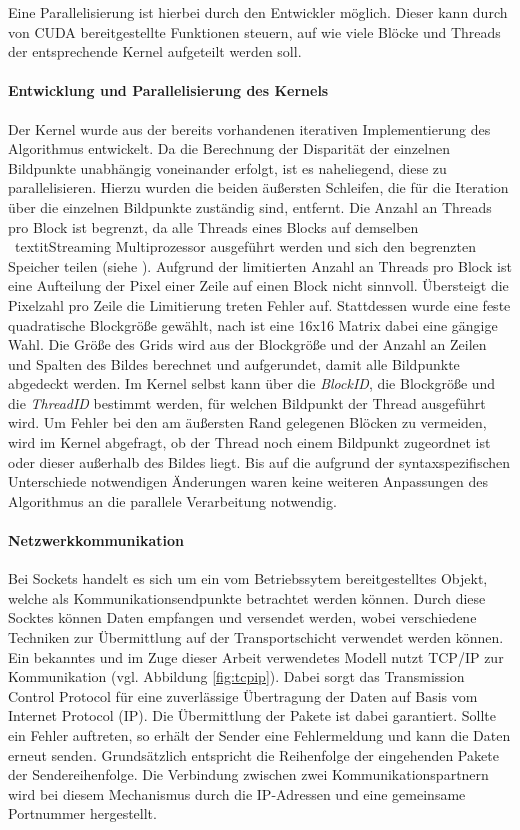 \documentclass[times, 10pt,twocolumn]{article}
\begin{document}
Eine Parallelisierung ist hierbei durch den Entwickler möglich. Dieser kann durch von CUDA bereitgestellte Funktionen steuern, auf wie viele Blöcke und Threads der entsprechende Kernel aufgeteilt werden soll.

\paragraph{Entwicklung und Parallelisierung des Kernels}
Der Kernel wurde aus der bereits vorhandenen iterativen Implementierung des Algorithmus entwickelt. Da die Berechnung der Disparität der einzelnen Bildpunkte unabhängig voneinander erfolgt, ist es naheliegend, diese zu parallelisieren. Hierzu wurden die beiden äußersten Schleifen, die für die Iteration über die einzelnen Bildpunkte zuständig sind, entfernt.  
Die Anzahl an Threads pro Block ist begrenzt, da alle Threads eines Blocks auf demselben \ textit{Streaming Multiprozessor} ausgeführt werden und sich den begrenzten Speicher teilen (siehe \cite{CUDA.2015}). Aufgrund der limitierten Anzahl an Threads pro Block ist eine Aufteilung der Pixel einer Zeile auf einen Block nicht sinnvoll. Übersteigt die Pixelzahl pro Zeile die Limitierung treten Fehler auf. Stattdessen wurde eine feste quadratische Blockgröße gewählt, nach \cite{CUDA.2015} ist eine 16x16 Matrix dabei eine gängige Wahl. 
Die Größe des Grids wird aus der Blockgröße und der Anzahl an Zeilen und Spalten des Bildes berechnet und aufgerundet, damit alle Bildpunkte abgedeckt werden. Im Kernel selbst kann über die \textit{BlockID}, die Blockgröße und die \textit{ThreadID} bestimmt werden, für welchen Bildpunkt der Thread ausgeführt wird. Um Fehler bei den am äußersten Rand gelegenen Blöcken zu vermeiden, wird im Kernel abgefragt, ob der Thread noch einem Bildpunkt zugeordnet ist oder dieser außerhalb des Bildes liegt.
Bis auf die aufgrund der syntaxspezifischen Unterschiede notwendigen Änderungen waren keine weiteren Anpassungen des Algorithmus an die parallele Verarbeitung notwendig.


\paragraph{Netzwerkkommunikation}
Bei Sockets handelt es sich um ein vom Betriebssytem bereitgestelltes Objekt, welche als Kommunikationsendpunkte betrachtet werden können. Durch diese Socktes können Daten empfangen und versendet werden, wobei verschiedene Techniken zur Übermittlung auf der Transportschicht verwendet werden können.
Ein bekanntes und im Zuge dieser Arbeit verwendetes Modell nutzt TCP/IP zur Kommunikation (vgl. Abbildung \ref{fig:tcpip}). Dabei sorgt das Transmission Control Protocol für eine zuverlässige Übertragung der Daten auf Basis vom Internet Protocol (IP). Die Übermittlung der Pakete ist dabei garantiert. Sollte ein Fehler auftreten, so erhält der Sender eine Fehlermeldung und kann die Daten erneut senden. Grundsätzlich entspricht die Reihenfolge der eingehenden Pakete der Sendereihenfolge.
Die Verbindung zwischen zwei Kommunikationspartnern wird bei diesem Mechanismus durch die IP-Adressen und eine gemeinsame Portnummer hergestellt.\cite{Willemer.2007}
\end{document}
